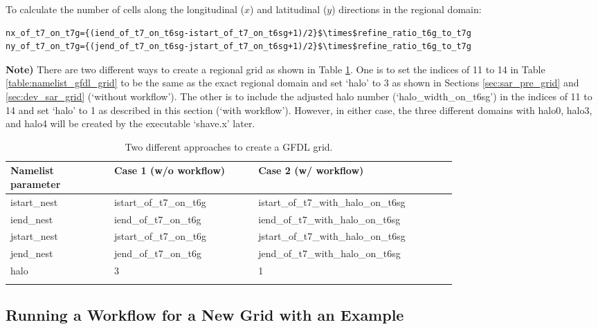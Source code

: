 \documentclass[11pt,fleqn]{report}              %
\begin{document}
\begin{enumerate}
To calculate the number of cells along the longitudinal ($x$) and latitudinal ($y$) directions in the regional domain:
\lstset{language=bash}   
\begin{lstlisting}[frame=trBL,mathescape=true, basicstyle=\small]
nx_of_t7_on_t7g={(iend_of_t7_on_t6sg-istart_of_t7_on_t6sg+1)/2}$\times$refine_ratio_t6g_to_t7g
ny_of_t7_on_t7g={(jend_of_t7_on_t6sg-jstart_of_t7_on_t6sg+1)/2}$\times$refine_ratio_t6g_to_t7g
\end{lstlisting}

\vspace{0.5cm}
{\bf Note)} There are two different ways to create a regional grid as shown in Table \ref{table:namelist_gfdl_grid_2ways}. One is to set the indices of 11 to 14 in Table \ref{table:namelist_gfdl_grid} to be the same as the exact regional domain and set `halo' to 3 as shown in Sections \ref{sec:sar_pre_grid} and \ref{sec:dev_sar_grid} (`without workflow'). The other is to include the adjusted halo number (`halo\_width\_on\_t6sg') in the indices of 11 to 14 and set `halo' to 1 as described in this section (`with workflow'). However, in either case, the three different domains with halo0, halo3, and halo4 will be created by the executable `shave.x' later.
{
\fontsize{10}{12}\selectfont
\begin{longtable}{ p{0.18\linewidth} | p{0.25\linewidth} | p{0.32\linewidth} }
\hline
\hline
 Namelist parameter & Case 1 (w/o workflow) & Case 2 (w/ workflow) \\
\hline
 istart\_nest & istart\_of\_t7\_on\_t6g &istart\_of\_t7\_with\_halo\_on\_t6sg \\
 iend\_nest & iend\_of\_t7\_on\_t6g & iend\_of\_t7\_with\_halo\_on\_t6sg\\
 jstart\_nest & jstart\_of\_t7\_on\_t6g & jstart\_of\_t7\_with\_halo\_on\_t6sg \\
 jend\_nest & jend\_of\_t7\_on\_t6g & jend\_of\_t7\_with\_halo\_on\_t6sg\\
 halo & 3 & 1 \\
\hline
\caption{Two different approaches to create a GFDL grid.}
\label{table:namelist_gfdl_grid_2ways}
\end{longtable}
}

\end{enumerate}



\subsection{Running a Workflow for a New Grid with an Example}
\label{subsec:new_predef_grid_wflow}
\end{document}

